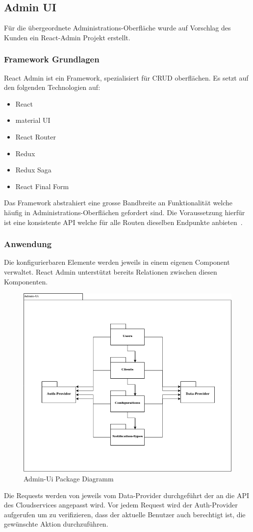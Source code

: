 \subsection{Admin UI}\label{subsec:admin-ui}
Für die übergeordnete Administrations-Oberfläche wurde auf Vorschlag des Kunden ein React-Admin Projekt erstellt.

\subsubsection{Framework Grundlagen}
React Admin ist ein Framework, spezialisiert für CRUD oberflächen.
Es setzt auf den folgenden Technologien auf:
\begin{itemize}
    \item React
    \item material UI
    \item React Router
    \item Redux
    \item Redux Saga
    \item React Final Form
\end{itemize}

Das Framework abstrahiert eine grosse Bandbreite an Funktionalität welche häufig in Administrations-Oberflächen gefordert sind.
Die Voraussetzung hierfür ist eine konsistente API welche für alle Routen dieselben Endpunkte anbieten~\cite{react-admin}.

\subsubsection{Anwendung}
Die konfigurierbaren Elemente werden jeweils in einem eigenen Component verwaltet.
React Admin unterstützt bereits Relationen zwischen diesen Komponenten.

\begin{figure}[h]
    \centering
    \label{fig:adminUi-packages}
    \includegraphics[width=.5\linewidth]{graphics/Admin-Ui-export}
    \caption[Admin-Ui Package Diagramm]{Admin-Ui Package Diagramm}
\end{figure}
Die Requests werden von jeweils vom Data-Provider durchgeführt der an die API des Cloudservices angepasst wird.
Vor jedem Request wird der Auth-Provider aufgerufen um zu verifizieren, dass der aktuelle Benutzer auch berechtigt ist, die gewünschte Aktion durchzuführen.

\clearpage